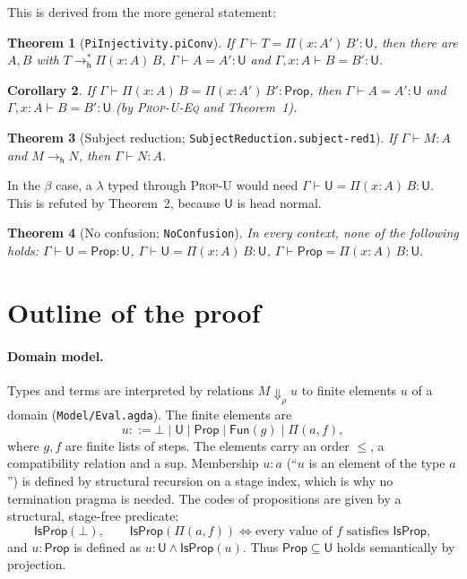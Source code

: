 \documentclass[11pt]{article}
\newcommand{\U}{\mathsf{U}}
\newcommand{\Prop}{\mathsf{Prop}}
\newcommand{\Pit}[2]{\Pi(#1)\,#2}
\newcommand{\ty}[3]{#1 \vdash #2 : #3}
\newcommand{\cv}[4]{#1 \vdash #2 = #3 : #4}
\newcommand{\hr}{\mathrel{\to^{*}_{\mathsf{h}}}}
\newcommand{\hrone}{\mathrel{\to_{\mathsf{h}}}}
\newcommand{\code}[1]{\mathsf{#1}}
\newcommand{\IsProp}{\mathsf{IsProp}}
\newcommand{\agda}[1]{\texttt{#1}}
\theoremstyle{plain}
\newtheorem{theorem}{Theorem}
\newtheorem{corollary}[theorem]{Corollary}
\theoremstyle{remark}
\begin{document}
\noindent This is derived from the more general statement:

\begin{theorem}[\agda{PiInjectivity.piConv}]
If $\cv{\Gamma}{T}{\Pit{x:A'}{B'}}{\U}$, then there are $A, B$ with
$T \hr \Pit{x:A}{B}$, $\cv{\Gamma}{A}{A'}{\U}$ and
$\cv{\Gamma, x{:}A}{B}{B'}{\U}$.
\end{theorem}

\begin{corollary}
If $\cv{\Gamma}{\Pit{x:A}{B}}{\Pit{x:A'}{B'}}{\Prop}$, then
$\cv{\Gamma}{A}{A'}{\U}$ and $\cv{\Gamma, x{:}A}{B}{B'}{\U}$
(by \textsc{Prop-U-Eq} and Theorem~1).
\end{corollary}

\begin{theorem}[Subject reduction; \agda{SubjectReduction.subject-red1}]
If $\ty{\Gamma}{M}{A}$ and $M \hrone N$, then $\ty{\Gamma}{N}{A}$.
\end{theorem}
In the $\beta$ case, a $\lambda$ typed through \textsc{Prop-U} would need
$\cv{\Gamma}{\U}{\Pit{x:A}{B}}{\U}$. This is refuted by Theorem~2, because
$\U$ is head normal.

\begin{theorem}[No confusion; \agda{NoConfusion}]
In every context, none of the following holds:
$\cv{\Gamma}{\U}{\Prop}{\U}$, $\cv{\Gamma}{\U}{\Pit{x:A}{B}}{\U}$,
$\cv{\Gamma}{\Prop}{\Pit{x:A}{B}}{\U}$.
\end{theorem}

\section{Outline of the proof}

\paragraph{Domain model.}
Types and terms are interpreted by relations $M \Downarrow_\rho u$ to
finite elements $u$ of a domain (\agda{Model/Eval.agda}). The finite
elements are
\[
  u ::= \bot \mid \code{U} \mid \code{Prop} \mid \code{Fun}(g) \mid \Pi(a, f),
\]
where $g, f$ are finite lists of steps. The elements carry an order $\le$,
a compatibility relation and a sup. Membership $u : a$ (``$u$ is an element of
the type $a$'') is defined by structural recursion on a stage index, which
is why no termination pragma is needed. The codes of propositions are given
by a structural, stage-free predicate:
\[
  \IsProp(\bot), \qquad
  \IsProp(\Pi(a, f)) \iff \text{every value of } f \text{ satisfies } \IsProp,
\]
and $u : \code{Prop}$ is defined as $u : \code{U} \wedge \IsProp(u)$. Thus
$\Prop \subseteq \U$ holds semantically by projection.
\end{document}
